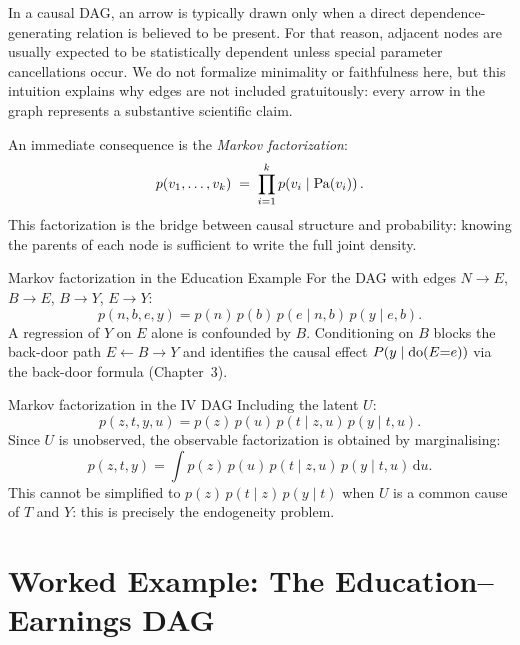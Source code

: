 \documentclass[master.tex]{subfiles}
\begin{document}
\begin{remark}
In a causal DAG, an arrow is typically drawn only when a direct
dependence-generating relation is believed to be present.
For that reason, adjacent nodes are usually expected to be statistically
dependent unless special parameter cancellations occur.
We do not formalize minimality or faithfulness here, but this intuition
explains why edges are not included gratuitously: every arrow in the graph
represents a substantive scientific claim.
\end{remark}

An immediate consequence is the \emph{Markov factorization}:
\begin{equation}
  p(v_1, \dots, v_k) \;=\; \prod_{i=1}^{k} p\!\left(v_i \mid \mathrm{Pa}(v_i)\right).
  \label{w2:eq:markov}
\end{equation}
This factorization is the bridge between causal structure and probability:
knowing the parents of each node is sufficient to write the full joint density.

\begin{example}{Markov factorization in the Education Example}
For the DAG with edges $N \to E$, $B \to E$, $B \to Y$, $E \to Y$:
\[
  p(n, b, e, y) = p(n)\,p(b)\,p(e \mid n, b)\,p(y \mid e, b).
\]
A regression of $Y$ on $E$ alone is confounded by $B$. Conditioning on $B$
blocks the back-door path $E \leftarrow B \to Y$ and identifies the causal
effect $P(y \mid \mathrm{do}(E{=}e))$ via the back-door formula (Chapter~3).
\end{example}

\begin{example}{Markov factorization in the IV DAG}
Including the latent $U$:
\[
  p(z, t, y, u) = p(z)\,p(u)\,p(t \mid z, u)\,p(y \mid t, u).
\]
Since $U$ is unobserved, the observable factorization is obtained by
marginalising:
\[
  p(z, t, y) = \int p(z)\,p(u)\,p(t \mid z, u)\,p(y \mid t, u)\,\mathrm{d}u.
\]
This cannot be simplified to $p(z)\,p(t\mid z)\,p(y\mid t)$ when $U$ is a
common cause of $T$ and $Y$: this is precisely the endogeneity problem.
\end{example}

\section{Worked Example: The Education--Earnings DAG}
\label{w2:sec:education}
\end{document}

